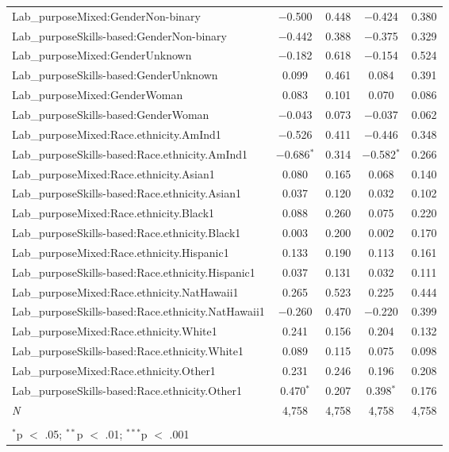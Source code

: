 \begin{table}[!htbp]
\begin{tabular}{@{\extracolsep{5pt}}lcccc}
  Lab\_purposeMixed:GenderNon-binary & $-$0.500 & 0.448 & $-$0.424 & 0.380 \\ 
  Lab\_purposeSkills-based:GenderNon-binary & $-$0.442 & 0.388 & $-$0.375 & 0.329 \\ 
  Lab\_purposeMixed:GenderUnknown & $-$0.182 & 0.618 & $-$0.154 & 0.524 \\ 
  Lab\_purposeSkills-based:GenderUnknown & 0.099 & 0.461 & 0.084 & 0.391 \\ 
  Lab\_purposeMixed:GenderWoman & 0.083 & 0.101 & 0.070 & 0.086 \\ 
  Lab\_purposeSkills-based:GenderWoman & $-$0.043 & 0.073 & $-$0.037 & 0.062 \\ 
  Lab\_purposeMixed:Race.ethnicity.AmInd1 & $-$0.526 & 0.411 & $-$0.446 & 0.348 \\ 
  Lab\_purposeSkills-based:Race.ethnicity.AmInd1 & $-$0.686$^{*}$ & 0.314 & $-$0.582$^{*}$ & 0.266 \\ 
  Lab\_purposeMixed:Race.ethnicity.Asian1 & 0.080 & 0.165 & 0.068 & 0.140 \\ 
  Lab\_purposeSkills-based:Race.ethnicity.Asian1 & 0.037 & 0.120 & 0.032 & 0.102 \\ 
  Lab\_purposeMixed:Race.ethnicity.Black1 & 0.088 & 0.260 & 0.075 & 0.220 \\ 
  Lab\_purposeSkills-based:Race.ethnicity.Black1 & 0.003 & 0.200 & 0.002 & 0.170 \\ 
  Lab\_purposeMixed:Race.ethnicity.Hispanic1 & 0.133 & 0.190 & 0.113 & 0.161 \\ 
  Lab\_purposeSkills-based:Race.ethnicity.Hispanic1 & 0.037 & 0.131 & 0.032 & 0.111 \\ 
  Lab\_purposeMixed:Race.ethnicity.NatHawaii1 & 0.265 & 0.523 & 0.225 & 0.444 \\ 
  Lab\_purposeSkills-based:Race.ethnicity.NatHawaii1 & $-$0.260 & 0.470 & $-$0.220 & 0.399 \\ 
  Lab\_purposeMixed:Race.ethnicity.White1 & 0.241 & 0.156 & 0.204 & 0.132 \\ 
  Lab\_purposeSkills-based:Race.ethnicity.White1 & 0.089 & 0.115 & 0.075 & 0.098 \\ 
  Lab\_purposeMixed:Race.ethnicity.Other1 & 0.231 & 0.246 & 0.196 & 0.208 \\ 
  Lab\_purposeSkills-based:Race.ethnicity.Other1 & 0.470$^{*}$ & 0.207 & 0.398$^{*}$ & 0.176 \\ 
 \textit{N} & 4,758 & 4,758 & 4,758 & 4,758 \\ 
\hline \\[-1.8ex] 
\multicolumn{5}{l}{$^{*}$p $<$ .05; $^{**}$p $<$ .01; $^{***}$p $<$ .001} \\ 
\end{tabular} 
\end{table} 
